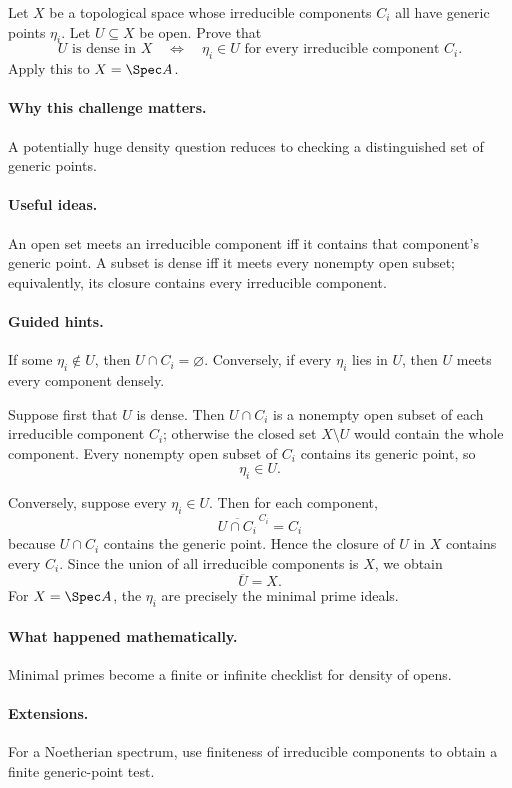 \begin{problem}
Let $X$ be a topological space whose irreducible components $C_i$ all have generic points
$\eta_i$.  Let $U\subseteq X$ be open.  Prove that
\[
U\text{ is dense in }X
\quad\Longleftrightarrow\quad
\eta_i\in U\text{ for every irreducible component }C_i.
\]
Apply this to $X=\Spec A$.
\end{problem}

\paragraph{Why this challenge matters.}
A potentially huge density question reduces to checking a distinguished set of generic
points.

\paragraph{Useful ideas.}
An open set meets an irreducible component iff it contains that component's generic point.
A subset is dense iff it meets every nonempty open subset; equivalently, its closure
contains every irreducible component.

\paragraph{Guided hints.}
If some $\eta_i\notin U$, then $U\cap C_i=\varnothing$.  Conversely, if every $\eta_i$ lies
in $U$, then $U$ meets every component densely.

\begin{solution}
Suppose first that $U$ is dense.  Then $U\cap C_i$ is a nonempty open subset of each
irreducible component $C_i$; otherwise the closed set $X\setminus U$ would contain the
whole component.  Every nonempty open subset of $C_i$ contains its generic point, so
\[
\eta_i\in U.
\]

Conversely, suppose every $\eta_i\in U$.  Then for each component,
\[
\overline{U\cap C_i}^{\,C_i}=C_i
\]
because $U\cap C_i$ contains the generic point.  Hence the closure of $U$ in $X$ contains
every $C_i$.  Since the union of all irreducible components is $X$, we obtain
\[
\overline U=X.
\]
For $X=\Spec A$, the $\eta_i$ are precisely the minimal prime ideals.
\end{solution}

\paragraph{What happened mathematically.}
Minimal primes become a finite or infinite checklist for density of opens.

\paragraph{Extensions.}
For a Noetherian spectrum, use finiteness of irreducible components to obtain a finite
generic-point test.

